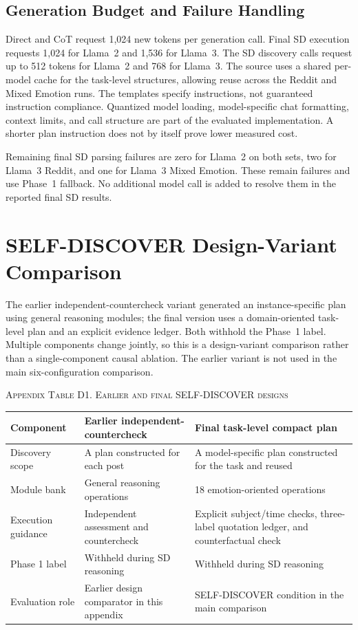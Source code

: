 \documentclass{ieeeaccess}
\begin{document}
\subsection{Generation Budget and Failure Handling}
Direct and CoT request 1,024 new tokens per generation call. Final SD execution requests 1,024 for Llama~2 and 1,536 for Llama~3. The SD discovery calls request up to 512 tokens for Llama~2 and 768 for Llama~3. The source uses a shared per-model cache for the task-level structures, allowing reuse across the Reddit and Mixed Emotion runs. The templates specify instructions, not guaranteed instruction compliance. Quantized model loading, model-specific chat formatting, context limits, and call structure are part of the evaluated implementation. A shorter plan instruction does not by itself prove lower measured cost.

Remaining final SD parsing failures are zero for Llama~2 on both sets, two for Llama~3 Reddit, and one for Llama~3 Mixed Emotion. These remain failures and use Phase~1 fallback. No additional model call is added to resolve them in the reported final SD results.
\section{SELF-DISCOVER Design-Variant Comparison}\label{app:sd-variants}
The earlier independent-countercheck variant generated an instance-specific plan using general reasoning modules; the final version uses a domain-oriented task-level plan and an explicit evidence ledger. Both withhold the Phase~1 label. Multiple components change jointly, so this is a design-variant comparison rather than a single-component causal ablation. The earlier variant is not used in the main six-configuration comparison.

\par\medskip\noindent\textsc{Appendix Table D1. Earlier and final SELF-DISCOVER designs}\par\smallskip
{\small\renewcommand{\arraystretch}{1.18}
\noindent\begin{tabularx}{\textwidth}{@{}p{}YY@{}}\toprule
Component & Earlier independent-countercheck & Final task-level compact plan \\\midrule
Discovery scope & A plan constructed for each post & A model-specific plan constructed for the task and reused \\
Module bank & General reasoning operations & 18 emotion-oriented operations \\
Execution guidance & Independent assessment and countercheck & Explicit subject/time checks, three-label quotation ledger, and counterfactual check \\
Phase 1 label & Withheld during SD reasoning & Withheld during SD reasoning \\
Evaluation role & Earlier design comparator in this appendix & SELF-DISCOVER condition in the main comparison \\\bottomrule
\end{tabularx}}\par\medskip
\end{document}
